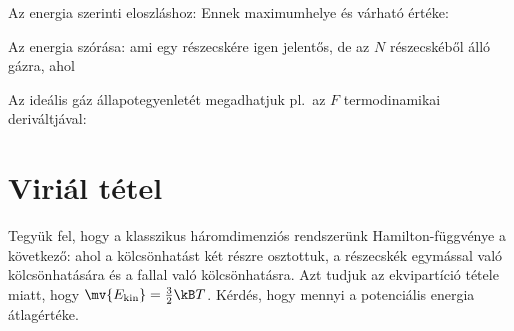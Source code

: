    Az energia szerinti eloszláshoz:
   Ennek maximumhelye és várható értéke:
   
   Az energia szórása:
   ami egy részecskére igen jelentős, de az $N$ részecskéből álló gázra, ahol
   
   Az ideális gáz állapotegyenletét megadhatjuk pl.\ az $F$ termodinamikai deriváltjával:
   
 \section{Viriál tétel}
  
  Tegyük fel, hogy a klasszikus háromdimenziós rendszerünk Hamilton-függvénye a következő:
  ahol a kölcsönhatást két részre osztottuk, a részecskék egymással való kölcsönhatására és a fallal való kölcsönhatásra.
   Azt tudjuk az ekvipartíció tétele miatt, hogy $\mv{E_\text{kin}}=\frac{3}{2}\kB T$.
   Kérdés, hogy mennyi a potenciális energia átlagértéke. 
  
